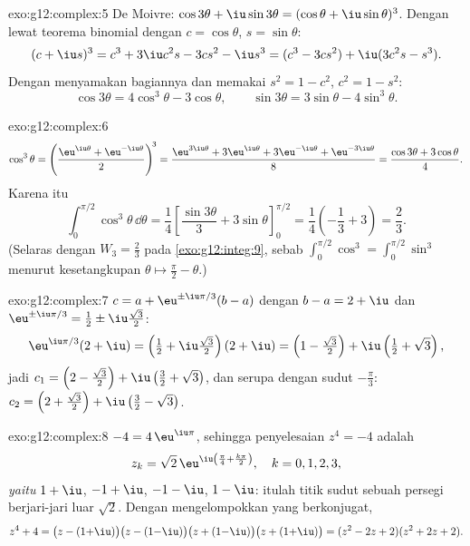 \begin{solution}{exo:g12:complex:5}
De Moivre: $\cos3\theta + \iu\sin3\theta = (\cos\theta + \iu\sin\theta)^3$.
Dengan  lewat teorema binomial dengan $c = \cos\theta$, $s = \sin\theta$:
\[
(c + \iu s)^3 = c^3 + 3\iu c^2 s - 3 c s^2 - \iu s^3
= (c^3 - 3cs^2) + \iu(3c^2 s - s^3).
\]
Dengan menyamakan bagiannya dan memakai $s^2 = 1 - c^2$, $c^2 = 1 - s^2$:
\[
\cos3\theta = 4\cos^3\theta - 3\cos\theta,
\qquad
\sin3\theta = 3\sin\theta - 4\sin^3\theta .
\]
\end{solution}

\begin{solution}{exo:g12:complex:6}
\[
\cos^3\theta = \left(\frac{\eu^{\iu\theta} + \eu^{-\iu\theta}}{2}\right)^{\!3}
= \frac{\eu^{3\iu\theta} + 3\eu^{\iu\theta} + 3\eu^{-\iu\theta} + \eu^{-3\iu\theta}}{8}
= \frac{\cos3\theta + 3\cos\theta}{4}.
\]
Karena itu
\[
\int_0^{\pi/2}\cos^3\theta\,\dd\theta
= \frac14\left[\frac{\sin3\theta}{3} + 3\sin\theta\right]_0^{\pi/2}
= \frac14\left(-\frac13 + 3\right) = \frac{2}{3}.
\]
(Selaras dengan $W_3 = \frac23$ pada \cref{exo:g12:integ:9}, sebab
$\int_0^{\pi/2}\cos^3 = \int_0^{\pi/2}\sin^3$ menurut kesetangkupan
$\theta \mapsto \frac\pi2 - \theta$.)
\end{solution}

\begin{solution}{exo:g12:complex:7}
$c = a + \eu^{\pm\iu\pi/3}(b - a)$ dengan $b - a = 2 + \iu$ dan
$\eu^{\pm\iu\pi/3} = \frac12 \pm \iu\frac{\sqrt3}{2}$:
\[
\eu^{\iu\pi/3}(2+\iu) = \left(\tfrac12 + \iu\tfrac{\sqrt3}{2}\right)(2+\iu)
= \left(1 - \tfrac{\sqrt3}{2}\right) + \iu\left(\tfrac12 + \sqrt3\right),
\]
jadi $c_1 = \left(2 - \frac{\sqrt3}{2}\right) +
\iu\left(\frac32 + \sqrt3\right)$, dan serupa dengan sudut
$-\frac\pi3$:
$c_2 = \left(2 + \frac{\sqrt3}{2}\right) + \iu\left(\frac32 - \sqrt3\right)$.
\end{solution}

\begin{solution}{exo:g12:complex:8}
$-4 = 4\,\eu^{\iu\pi}$, sehingga penyelesaian $z^4 = -4$ adalah
\[
z_k = \sqrt2\,\eu^{\iu\left(\frac\pi4 + \frac{k\pi}{2}\right)},
\quad k = 0, 1, 2, 3,
\]
\emph{yaitu} $1 + \iu$, $-1 + \iu$, $-1 - \iu$, $1 - \iu$: itulah titik sudut
sebuah persegi berjari-jari luar $\sqrt 2$. Dengan mengelompokkan  yang berkonjugat,
\[
z^4 + 4 = \bigl(z - (1{+}\iu)\bigr)\bigl(z - (1{-}\iu)\bigr)
\bigl(z + (1{-}\iu)\bigr)\bigl(z + (1{+}\iu)\bigr)
= (z^2 - 2z + 2)(z^2 + 2z + 2).
\]
\end{solution}

